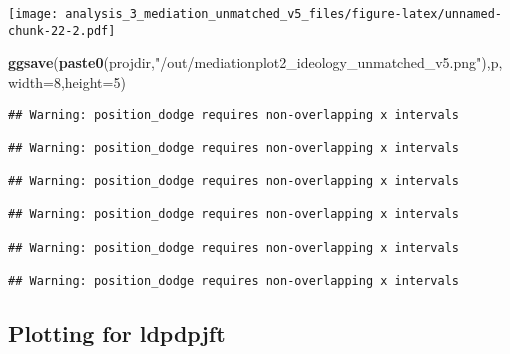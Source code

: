 \documentclass[
]{article}
\newenvironment{Shaded}{\begin{snugshade}}{\end{snugshade}}
\newcommand{\DataTypeTok}[1]{\textcolor[rgb]{0.13,0.29,0.53}{#1}}
\newcommand{\DecValTok}[1]{\textcolor[rgb]{0.00,0.00,0.81}{#1}}
\newcommand{\KeywordTok}[1]{\textcolor[rgb]{0.13,0.29,0.53}{\textbf{#1}}}
\newcommand{\NormalTok}[1]{#1}
\newcommand{\StringTok}[1]{\textcolor[rgb]{0.31,0.60,0.02}{#1}}
\begin{document}
\texttt{[image: analysis\_3\_mediation\_unmatched\_v5\_files/figure-latex/unnamed-chunk-22-2.pdf]}

\begin{Shaded}
\begin{Highlighting}[]
\KeywordTok{ggsave}\NormalTok{(}\KeywordTok{paste0}\NormalTok{(projdir,}\StringTok{"/out/mediationplot2_ideology_unmatched_v5.png"}\NormalTok{),p,}\DataTypeTok{width=}\DecValTok{8}\NormalTok{,}\DataTypeTok{height=}\DecValTok{5}\NormalTok{)}
\end{Highlighting}
\end{Shaded}

\begin{verbatim}
## Warning: position_dodge requires non-overlapping x intervals

## Warning: position_dodge requires non-overlapping x intervals

## Warning: position_dodge requires non-overlapping x intervals

## Warning: position_dodge requires non-overlapping x intervals

## Warning: position_dodge requires non-overlapping x intervals

## Warning: position_dodge requires non-overlapping x intervals
\end{verbatim}

\hypertarget{plotting-for-ldpdpjft}{%
\subsection{Plotting for ldpdpjft}\label{plotting-for-ldpdpjft}}
\end{document}
